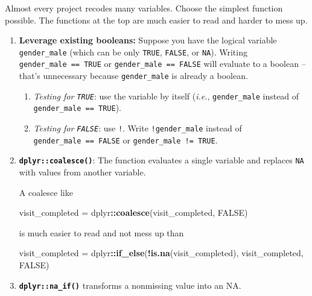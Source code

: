 \documentclass[
]{book}
\newenvironment{Shaded}{\begin{snugshade}}{\end{snugshade}}
\newcommand{\KeywordTok}[1]{\textcolor[rgb]{0.13,0.29,0.53}{\textbf{#1}}}
\newcommand{\NormalTok}[1]{#1}
\newcommand{\OperatorTok}[1]{\textcolor[rgb]{0.81,0.36,0.00}{\textbf{#1}}}
\newcommand{\OtherTok}[1]{\textcolor[rgb]{0.56,0.35,0.01}{#1}}
\newcommand{\StringTok}[1]{\textcolor[rgb]{0.31,0.60,0.02}{#1}}
\begin{document}
Almost every project recodes many variables. Choose the simplest function possible. The functions at the top are much easier to read and harder to mess up.

\begin{enumerate}
\def\labelenumi{\arabic{enumi}.}
\item
  \textbf{Leverage existing booleans:} Suppose you have the logical variable \texttt{gender\_male} (which can be only \texttt{TRUE}, \texttt{FALSE}, or \texttt{NA}). Writing \texttt{gender\_male\ ==\ TRUE} or \texttt{gender\_male\ ==\ FALSE} will evaluate to a boolean --that's unnecessary because \texttt{gender\_male} is already a boolean.

  \begin{enumerate}
  \def\labelenumii{\arabic{enumii}.}
  \item
    \emph{Testing for \texttt{TRUE}}: use the variable by itself (\emph{i.e.}, \texttt{gender\_male} instead of \texttt{gender\_male\ ==\ TRUE}).
  \item
    \emph{Testing for \texttt{FALSE}}: use \texttt{!}. Write \texttt{!gender\_male} instead of \texttt{gender\_male\ ==\ FALSE} or \texttt{gender\_male\ !=\ TRUE}.
  \end{enumerate}
\item
  \textbf{\texttt{dplyr::coalesce()}}: The function evaluates a single variable and replaces \texttt{NA} with values from another variable.

  A coalesce like

\begin{Shaded}
\begin{Highlighting}[]
\NormalTok{visit\_completed =}\StringTok{ }\NormalTok{dplyr}\OperatorTok{::}\KeywordTok{coalesce}\NormalTok{(visit\_completed, }\OtherTok{FALSE}\NormalTok{)}
\end{Highlighting}
\end{Shaded}

  is much easier to read and not mess up than

\begin{Shaded}
\begin{Highlighting}[]
\NormalTok{visit\_completed =}\StringTok{ }\NormalTok{dplyr}\OperatorTok{::}\KeywordTok{if\_else}\NormalTok{(}\OperatorTok{!}\KeywordTok{is.na}\NormalTok{(visit\_completed), visit\_completed, }\OtherTok{FALSE}\NormalTok{)}
\end{Highlighting}
\end{Shaded}
\item
  \textbf{\texttt{dplyr::na\_if()}} transforms a nonmissing value into an NA.


\end{enumerate}
\end{document}
